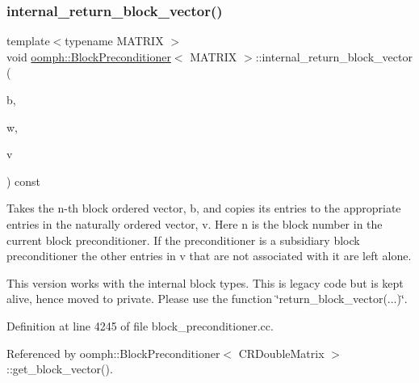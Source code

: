 \mbox{\label{classoomph_1_1BlockPreconditioner_a04e260cc4160a952db2d410109fb2684}} 
\subsubsection{\texorpdfstring{internal\+\_\+return\+\_\+block\+\_\+vector()}{internal\_return\_block\_vector()}}
{\footnotesize\ttfamily template$<$typename M\+A\+T\+R\+IX $>$ \\
void \hyperlink{classoomph_1_1BlockPreconditioner}{oomph\+::\+Block\+Preconditioner}$<$ M\+A\+T\+R\+IX $>$\+::internal\+\_\+return\+\_\+block\+\_\+vector (\begin{DoxyParamCaption}\item[{const unsigned \&}]{b,  }\item[{const \hyperlink{classoomph_1_1DoubleVector}{Double\+Vector} \&}]{w,  }\item[{\hyperlink{classoomph_1_1DoubleVector}{Double\+Vector} \&}]{v }\end{DoxyParamCaption}) const}



Takes the n-\/th block ordered vector, b, and copies its entries to the appropriate entries in the naturally ordered vector, v. Here n is the block number in the current block preconditioner. If the preconditioner is a subsidiary block preconditioner the other entries in v that are not associated with it are left alone. 

This version works with the internal block types. This is legacy code but is kept alive, hence moved to private. Please use the function \char`\"{}return\+\_\+block\+\_\+vector(...)\char`\"{}. 

Definition at line 4245 of file block\+\_\+preconditioner.\+cc.



Referenced by oomph\+::\+Block\+Preconditioner$<$ C\+R\+Double\+Matrix $>$\+::get\+\_\+block\+\_\+vector().

\mbox{\label{classoomph_1_1BlockPreconditioner_a2ca7f125e50493073d116ba8da271af5}} 
